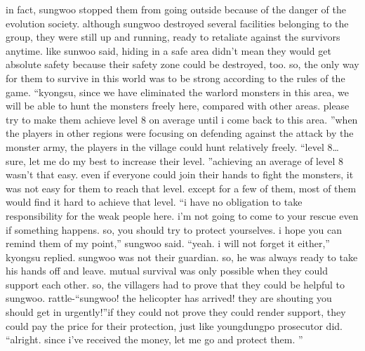 in fact, sungwoo stopped them from going outside because of the danger of the evolution society.
 although sungwoo destroyed several facilities belonging to the group, they were still up and running, ready to retaliate against the survivors anytime.
like sunwoo said, hiding in a safe area didn’t mean they would get absolute safety because their safety zone could be destroyed, too.
so, the only way for them to survive in this world was to be strong according to the rules of the game.
“kyongsu, since we have eliminated the warlord monsters in this area, we will be able to hunt the monsters freely here, compared with other areas.
 please try to make them achieve level 8 on average until i come back to this area.
”when the players in other regions were focusing on defending against the attack by the monster army, the players in the village could hunt relatively freely.
“level 8… sure, let me do my best to increase their level.
”achieving an average of level 8 wasn’t that easy.
 even if everyone could join their hands to fight the monsters, it was not easy for them to reach that level.
 except for a few of them, most of them would find it hard to achieve that level.
“i have no obligation to take responsibility for the weak people here.
 i’m not going to come to your rescue even if something happens.
 so, you should try to protect yourselves.
 i hope you can remind them of my point,” sungwoo said.
“yeah.
 i will not forget it either,” kyongsu replied.
sungwoo was not their guardian.
 so, he was always ready to take his hands off and leave.
mutual survival was only possible when they could support each other.
 so, the villagers had to prove that they could be helpful to sungwoo.
rattle-“sungwoo! the helicopter has arrived! they are shouting you should get in urgently!”if they could not prove they could render support, they could pay the price for their protection, just like youngdungpo prosecutor did.
“alright.
 since i’ve received the money, let me go and protect them.
”

 